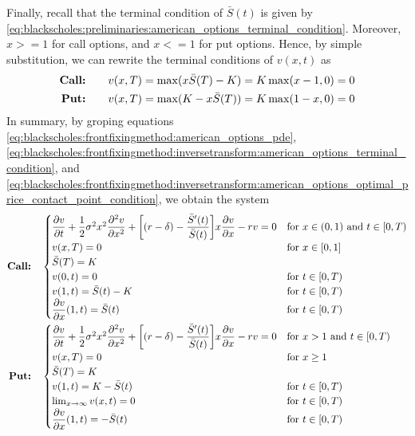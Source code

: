 Finally, recall that the terminal condition of $\bar{S}(t)$ is given by \eqref{eq:blackscholes:preliminaries:american_options_terminal_condition}. Moreover,
$x>=1$ for call options, and $x<=1$ for put options. Hence, by simple substitution, we can rewrite the terminal conditions of $v(x, t)$ as
\begin{subequations} \label{eq:blackscholes:frontfixingmethod:inversetransform:american_options_terminal_condition}
  \begin{align}
    \text{\textbf{Call:}} \qquad & v(x, T) = \max(x\bar{S}(T) - K) = K \max(x - 1, 0) = 0 \\
    \text{\textbf{Put:}} \qquad & v(x, T) = \max(K - x\bar{S}(T)) = K \max(1 - x, 0) = 0
  \end{align}
\end{subequations}
In summary, by groping equations
\eqref{eq:blackscholes:frontfixingmethod:american_options_pde},
\eqref{eq:blackscholes:frontfixingmethod:inversetransform:american_options_terminal_condition}, and
\eqref{eq:blackscholes:frontfixingmethod:inversetransform:american_options_optimal_price_contact_point_condition},
we obtain the system
\begin{subequations} \label{eq:blackscholes:frontfixingmethod:inversetransform:american_options_bs_pde}
  \begin{align}
    \text{\textbf{Call:}} \quad &
    \begin{cases}
      \dfrac{\partial{v}}{\partial{t}} + \dfrac{1}{2}\sigma^{2} x^2 \dfrac{\partial^2{v}}{\partial{x}^2} + \bigg[(r - \delta) -
      \dfrac{\bar{S}^\prime(t)}{\bar{S}(t)}\bigg]x\dfrac{\partial{v}}{\partial{x}} - rv = 0 & \text{for $x \in (0, 1)$ and $t \in [0, T)$} \\ 
      v(x, T) = 0 & \text{for $x\in[0, 1]$}  \\
      \bar{S}(T) = K \\ 
      v(0, t) = 0 & \text{for $t\in[0, T)$}\\ 
      v(1, t) = \bar{S}(t) - K & \text{for $t\in[0, T)$}\\ 
      \dfrac{\partial{v}}{\partial{x}}(1, t) = \bar{S}(t) & \text{for $t\in[0, T)$}
    \end{cases}\\
    \text{\textbf{Put:}} \quad &
    \begin{cases}
      \dfrac{\partial{v}}{\partial{t}} + \dfrac{1}{2}\sigma^{2} x^2 \dfrac{\partial^2{v}}{\partial{x}^2} + \bigg[(r - \delta) -
      \dfrac{\bar{S}^\prime(t)}{\bar{S}(t)}\bigg]x\dfrac{\partial{v}}{\partial{x}} - rv = 0 & \text{for $x > 1$ and $t \in [0, T)$} \\ 
      v(x, T) = 0 & \text{for $x \ge 1$} \\
      \bar{S}(T) = K \\ 
      v(1, t) = K - \bar{S}(t) & \text{for $t\in[0, T)$} \\
      \lim_{x\rightarrow\infty}v(x, t) = 0 & \text{for $t\in[0, T)$} \\
      \dfrac{\partial{v}}{\partial{x}}(1, t) = -\bar{S}(t) & \text{for $t\in[0, T)$}
    \end{cases}
  \end{align}
\end{subequations}
